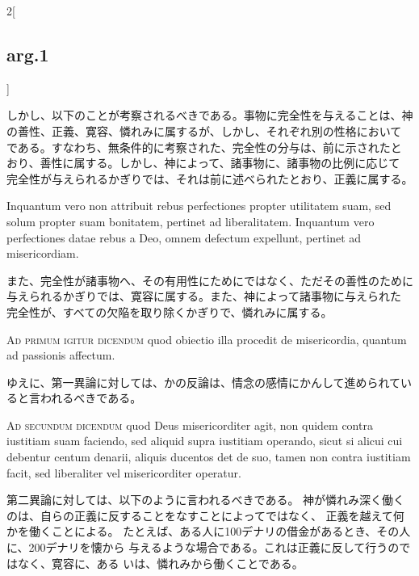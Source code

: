 \documentclass[paper=a4paper,fontsize=10pt,jafontsize=9pt,titlepage]{jlreq}
\begin{document}
\begin{paracol}{2}[\subsection{arg.1}]
\switchcolumn

しかし、以下のことが考察されるべきである。事物に完全性を与えることは、神
 の善性、正義、寛容、憐れみに属するが、しかし、それぞれ別の性格において
 である。すなわち、無条件的に考察された、完全性の分与は、前に示されたと
 おり、善性に属する。しかし、神によって、諸事物に、諸事物の比例に応じて
 完全性が与えられるかぎりでは、それは前に述べられたとおり、正義に属する。

\switchcolumn*

Inquantum vero non attribuit
rebus perfectiones propter utilitatem suam, sed solum propter suam
bonitatem, pertinet ad liberalitatem. Inquantum vero perfectiones datae
rebus a Deo, omnem defectum expellunt, pertinet ad misericordiam.

\switchcolumn

また、完全性が諸事物へ、その有用性にためにではなく、ただその善性のために
 与えられるかぎりでは、寛容に属する。また、神によって諸事物に与えられた
 完全性が、すべての欠陥を取り除くかぎりで、憐れみに属する。

\switchcolumn*[\subsection{ad.1}]

{\scshape Ad primum igitur dicendum} quod obiectio illa
procedit de misericordia, quantum ad passionis affectum.

\switchcolumn

ゆえに、第一異論に対しては、かの反論は、情念の感情にかんして進められてい
 ると言われるべきである。

\switchcolumn*[\subsection{ad.2}]

{\scshape Ad secundum dicendum} quod Deus misericorditer
agit, non quidem contra iustitiam suam faciendo, sed aliquid supra
iustitiam operando, sicut si alicui cui debentur centum denarii, aliquis
ducentos det de suo, tamen non contra iustitiam facit, sed liberaliter
vel misericorditer operatur.

\switchcolumn

第二異論に対しては、以下のように言われるべきである。
神が憐れみ深く働くのは、自らの正義に反することをなすことによってではなく、
 正義を越えて何かを働くことによる。
たとえば、ある人に100デナリの借金があるとき、その人に、200デナリを懐から
 与えるような場合である。これは正義に反して行うのではなく、寛容に、ある
 いは、憐れみから働くことである。


\end{paracol}
\end{document}
